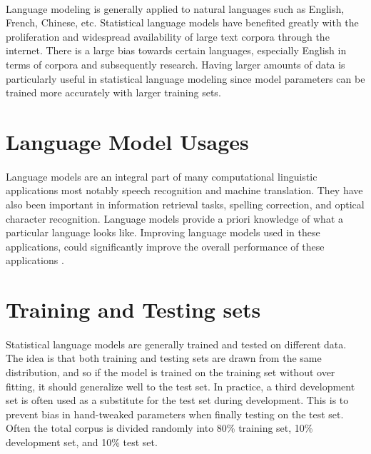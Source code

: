 \paragraph{}
Language modeling is generally applied to natural languages such as English, French, Chinese, etc. Statistical language models have benefited greatly with the proliferation and widespread availability of large text corpora through the internet. There is a large bias towards certain languages, especially English in terms of corpora and subsequently research. Having larger amounts of data is particularly useful in statistical language modeling since model parameters can be trained more accurately with larger training sets. 

\section{Language Model Usages}
\paragraph{}
Language models are an integral part of many computational linguistic applications most notably speech recognition and machine translation. They have also been important in information retrieval tasks, spelling correction, and optical character recognition. Language models provide a priori knowledge of what a particular language looks like. Improving language models used in these applications, could significantly improve the overall performance of these applications \cite{Jurafsky2009}. 

\section{Training and Testing sets}
\paragraph{}
Statistical language models are generally trained and tested on different data. The idea is that both training and testing sets are drawn from the same distribution, and so if the model is trained on the training set without over fitting, it should generalize well to the test set. In practice, a third development set is often used as a substitute for the test set during development. This is to prevent bias in hand-tweaked parameters when finally testing on the test set. Often the total corpus is divided randomly into 80\% training set, 10\% development set, and 10\% test set.

